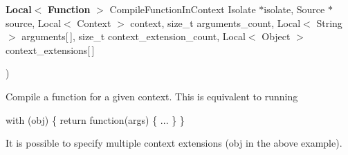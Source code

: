 {\begin{DoxyParamCaption}
\item[{{\bf Local}$<$ {\bf Function} $>$ }]{Compile\+Function\+In\+Context                                                                                                                                                                                                                                   Isolate $\ast$isolate, Source $\ast$source,                                                                                                                                                                                                                                   Local$<$ Context $>$ context, size\+\_\+t arguments\+\_\+count,                                                                                                                                                                                                                                   Local$<$ String $>$ arguments\mbox{[}$\,$\mbox{]},                                                                                                                                                                                                                                   size\+\_\+t context\+\_\+extension\+\_\+count,                                                                                                                                                                                                                                   Local$<$ Object $>$ context\+\_\+extensions\mbox{[}$\,$\mbox{]}}
\end{DoxyParamCaption}
)\hspace{0.3cm}{\ttfamily [static]}}\hypertarget{classv8_1_1_script_compiler_a94eb1a7257e9bf4c2f15cb7a14887d05}{}\label{classv8_1_1_script_compiler_a94eb1a7257e9bf4c2f15cb7a14887d05}
Compile a function for a given context. This is equivalent to running

with (obj) \{ return function(args) \{ ... \} \}

It is possible to specify multiple context extensions (obj in the above example). 
